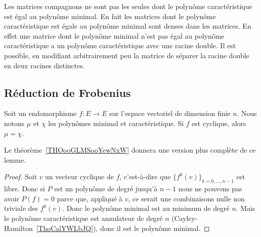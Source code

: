 \begin{remark}  \label{RemmQjZOA}
    Les matrices compagnons ne sont pas les seules dont le polynôme caractéristique est égal au polynôme minimal. En fait les matrices dont le polynôme caractéristique est égale au polynôme minimal sont denses dans les matrices. En effet une matrice dont le polynôme minimal n'est pas égal au polynôme caractéristique a un polynôme caractéristique avec une racine double. Il est possible, en modifiant arbitrairement peu la matrice de séparer la racine double en deux racines distinctes.
\end{remark}

\subsection{Réduction de Frobenius}

\begin{lemma}       \label{LEMooKUQDooKFeIYq}
    Soit un endomorphisme \( f\colon E\to E\) sur l'espace vectoriel de dimension finie \( n\). Nous notons \( \mu\) et \( \chi\) les polynômes minimal et caractéristique. Si \( f\) est cyclique, alors \( \mu=\chi\).
\end{lemma}
Le théorème~\ref{THOooGLMSooYewNxW} donnera une version plus complète de ce lemme.

\begin{proof}
    Soit \( v\) un vecteur cyclique de \( f\), c'est-à-dire que \( \{ f^k(v) \}_{k=0,\ldots, n-1}\) est libre. Donc si \( P\) est un polynôme de degré jusqu'à \( n-1\) nous ne pouvons pas avoir \( P(f)=0\) parce que, appliqué à \( v\), ce serait une combinaisons nulle non triviale des \( f^k(v)\). Donc le polynôme minimal est au minimum de degré \( n\). Mais le polynôme caractéristique est annulateur de degré \( n\) (Cayley-Hamilton~\ref{ThoCalYWLbJQ}), donc il est le polynôme minimal.
\end{proof}

